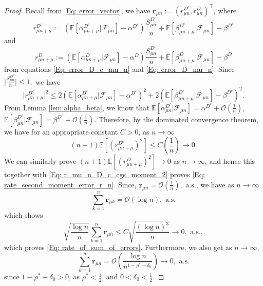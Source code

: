 \documentclass{article}
\numberwithin{equation}{section}
\newcommand{\FF}{\mbox{${\mathcal F}$}}
\newcommand{\OO}{\mbox{${\mathcal O}$}}
\newcommand{\1}{\mathbf{1}}
\newcommand{\0}{\mathbf{0}}
\newcommand{\br}{\mathbf{r}}
\newcommand{\E}{\mbox{${\mathbb E}$}}
\begin{document}
\begin{proof}
 Recall from \eqref{Eq: error_vector}, we have $\br_{ \mu{n}}:= \left( r_{\mu n}^{D^c}, r_{\mu n}^{D}\right)^\top$, where 
\[
r_{\mu{n+\mu}}^{D^c}:= \left(\E \left[\alpha_{\mu{n+\mu}}^{D^c}| \FF_{\mu n}\right]-\alpha^{D^c}\right)\frac{S_{\mu n}^{D^c}}{n}+ \E \left[\beta_{\mu{n+\mu}}^{D^c}| \FF_{\mu n}\right]- \beta^{{D^c}}
\]
and 
\[
r_{\mu{n+\mu}}^{D}:= \left(\E \left[\alpha_{\mu{n+\mu}}^{D} | \FF_{\mu n} \right]-\alpha^{D}\right)\frac{S_{\mu n}^{D^c}}{n}+ \E \left[\beta_{\mu{n+\mu}}^{D} | \FF_{\mu n} \right]- \beta^{{D}}
\]
from equations \eqref{Eq: error_D_c_mu_n} and \eqref{Eq: error_D_mu_n}.
Since $\lvert \frac{S_{\mu n}^{D^c}}{n}\rvert \le 1,$ we have 
\[
\lvert r_{\mu{n+\mu}}^{D^c} \rvert ^2 \le 2 \left( \E \left[\alpha_{\mu{n+\mu}}^{D^c}| \FF_{\mu n}\right]-\alpha^{D^c}\right)^2+ 2\left(\E \left[\beta_{\mu{n+\mu}}^{D^c}| \FF_{\mu n}\right]- \beta^{D^c}\right)^2. 
\] 
From Lemma \ref{lem:alpha_beta}, we know that 
$\E[\alpha_{\mu n}^{D^c} \vert \FF_{\mu n}] = \alpha^{D^c} + \OO\left(\frac{1}{n}\right)$, $\E[\beta_{\mu n}^{D^c} \vert \FF_{\mu n}] = \beta^{D^c} + \OO\left(\frac{1}{n}\right)$. Therefore, by the dominated convergence theorem, we have for an appropriate constant $C>0$, as $n \to \infty$
\begin{equation}
\label{Eq: r_mu_n_D_c_cgs_moment_2}
(n+1)\E\left[ \left(r_{\mu{n+\mu}}^{D^c}\right)^2\right] \le  C \left(\frac{1}{n}\right) \longrightarrow 0. 
\end{equation}
We can similarly prove $ (n+1)\E\left[ \left(r_{\mu{n+\mu}}^{D}\right) ^2\right]\longrightarrow 0$ as $n \to \infty$, and hence this together with \eqref{Eq: r_mu_n_D_c_cgs_moment_2} proves \eqref{Eq: rate_second_moment_error_r_n}.
Since, $\br_{ \mu{n}} = \OO(\frac{1}{n}), \text{ a.s.}$, we have 
as $n \to \infty$
\begin{equation*}
\sum_{k=1}^n \br_{ \mu{k}} = \mathcal{O}\left(\log n\right), \text{ a.s.}
\end{equation*} which shows 
\begin{equation}
\label{Eq: rate_of_sum_error1}
\sqrt{\frac{\log n}{n}}\sum_{k=1}^n  \br_{ \mu{n}} \le C \sqrt{\frac{(\log n)^3}{n}}\rightarrow 0, \text{ a.s.},
\end{equation}
which proves \eqref{Eq: rate_of_sum_of_errors}. Furthermore, we also get as $n \to \infty$, 
\begin{equation*}
\label{Eq: rate_of_sum_error2}
\sum_{k=1}^n  \br_{ \mu{n}} =\OO \left( \frac{\log n}{n^{1-\rho^* -\delta_0}} \right) \longrightarrow 0, \text{ a.s.}
\end{equation*}
since $1-\rho^* - \delta_0>0$, as $\rho^*< \frac{1}{2}$, and $0< \delta_0 < \frac{1}{2}$.
\end{proof}
\end{document}
